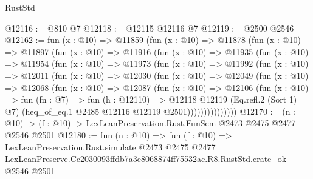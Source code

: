\begin{lexlean}{RustStd}
\begin{coremodule}
@12116 := @810 @7
@12118 := @12115 @12116 @7
@12119 := @2500 @2546
@12162 := fun (x : @10) =>
  @11859
    (fun (x : @10) =>
    @11878
      (fun (x : @10) =>
      @11897
        (fun (x : @10) =>
        @11916
          (fun (x : @10) =>
          @11935
            (fun (x : @10) =>
            @11954
              (fun (x : @10) =>
              @11973
                (fun (x : @10) =>
                @11992
                  (fun (x : @10) =>
                  @12011
                    (fun (x : @10) =>
                    @12030
                      (fun (x : @10) =>
                      @12049
                        (fun (x : @10) =>
                        @12068
                          (fun (x : @10) =>
                          @12087
                            (fun (x : @10) =>
                            @12106
                              (fun (x : @10) =>
                              fun (fn : @7) =>
                              fun (h : @12110) =>
                              @12118
                                @12119
                                (Eq.refl.{2} (Sort 1) @7)
                                (heq_of_eq.{1} @2485 @12116 @12119 @2501)))))))))))))))
@12170 := (n : @10) -> (f : @10) -> LexLeanPreservation.Rust.FunSem @2473 @2475 @2477 @2546 @2501
@12180 := fun (n : @10) =>
  fun (f : @10) =>
  LexLeanPreservation.Rust.simulate
    @2473
    @2475
    @2477
    LexLeanPreserve.Cc2030093ffdb7a3e8068874ff75532ac.R8.RustStd.crate_ok
    @2546
    @2501
\end{coremodule}
\end{lexlean}
